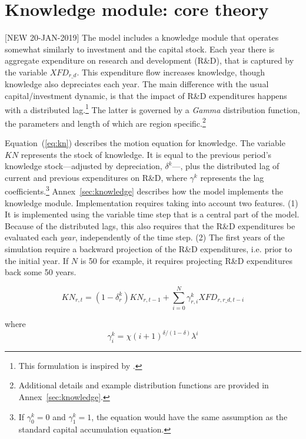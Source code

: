 \documentclass[11pt,letterpaper]{report}
\begin{document}
\section{Knowledge module: core theory}

[NEW 20-JAN-2019] The model includes a knowledge
module that operates somewhat similarly to investment
and the capital stock. Each year there is aggregate expenditure
on research and development (R\&D), that is captured
by the variable $\mathit{XFD}_{\mathit{r\_d}}$. This
expenditure flow increases knowledge, though knowledge
also depreciates each year. The main difference
with the usual capital/investment dynamic,
is that the impact
of R\&D expenditures happens with a distributed lag.\footnote{This
formulation is inspired by \cite{SmeetsKristkova2016}.}
The latter is governed by a \emph{Gamma} distribution
function, the parameters and length of which
are region specific.\footnote{Additional details
and example distribution functions are provided
in Annex~\ref{sec:knowledge}.}

Equation~(\ref{eq:kn}) describes the motion equation for knowledge.
The variable $\mathit{KN}$ represents
the stock of knowledge. It is equal to the previous
period's knowledge stock---adjusted by depreciation, $\delta^k$---,
plus the distributed lag of current
and previous expenditures on R\&D, where $\gamma^k$
represents the lag coefficients.\footnote{If
$\gamma^k_0=0$ and $\gamma^k_{1}=1$, the equation
would have the same assumption as the standard
capital accumulation equation.}
Annex~\ref{sec:knowledge} describes how the
model implements the knowledge module. Implementation
requires taking into account two features. (1) It is implemented
using the variable time step that is a central
part of the model. Because of the distributed
lags, this also requires that the R\&D expenditures
be evaluated each \emph{year}, independently of
the time step. (2) The first years of the simulation require
a backward projection of the R\&D expenditures,
i.e. prior to the initial year. If $N$ is 50
for example, it requires projecting R\&D
expenditures back some 50 years.

\begin{equation}
\label{eq:kn}
\mathit{KN}_{r,t} = \left(1-\delta^k_r \right) \mathit{KN}_{r,t-1}
+ \sum_{i=0}^N{\gamma^k_{r,i} \mathit{XFD}_{r,\mathit{r\_d},t-i}}
\end{equation}

\noindent where
\[
\gamma^k_{i} = \chi \left(i + 1 \right)^{\delta/(1-\delta)}\lambda^i
\]
\end{document}
